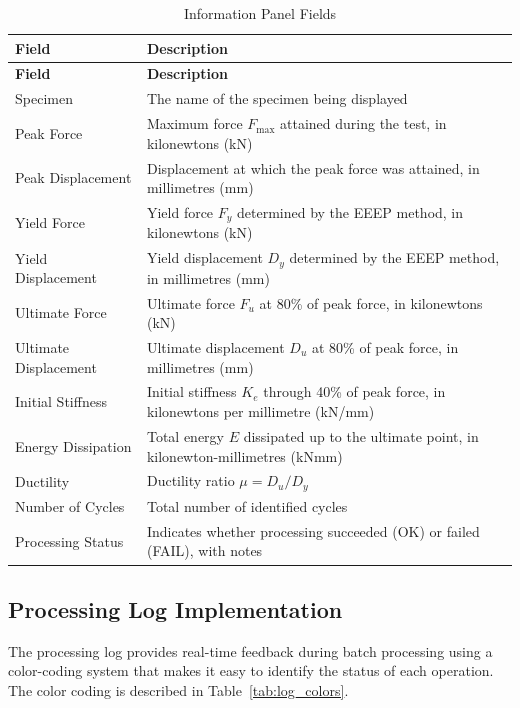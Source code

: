 \documentclass[11pt,a4paper]{article}
\begin{document}
\begin{longtable}{p{5cm}p{9cm}}
\caption{Information Panel Fields}\label{tab:info_panel}\\
\toprule
\textbf{Field} & \textbf{Description} \\
\midrule
\endfirsthead
\toprule
\textbf{Field} & \textbf{Description} \\
\midrule
\endhead
Specimen & The name of the specimen being displayed \\
Peak Force & Maximum force \(F_{\max}\) attained during the test, in kilonewtons (kN) \\
Peak Displacement & Displacement at which the peak force was attained, in millimetres (mm) \\
Yield Force & Yield force \(F_y\) determined by the EEEP method, in kilonewtons (kN) \\
Yield Displacement & Yield displacement \(D_y\) determined by the EEEP method, in millimetres (mm) \\
Ultimate Force & Ultimate force \(F_u\) at 80\% of peak force, in kilonewtons (kN) \\
Ultimate Displacement & Ultimate displacement \(D_u\) at 80\% of peak force, in millimetres (mm) \\
Initial Stiffness & Initial stiffness \(K_e\) through 40\% of peak force, in kilonewtons per millimetre (kN/mm) \\
Energy Dissipation & Total energy \(E\) dissipated up to the ultimate point, in kilonewton-millimetres (kNmm) \\
Ductility & Ductility ratio \(\mu = D_u/D_y\) \\
Number of Cycles & Total number of identified cycles \\
Processing Status & Indicates whether processing succeeded (OK) or failed (FAIL), with notes \\
\bottomrule
\end{longtable}

\subsection{Processing Log Implementation}

The processing log provides real-time feedback during batch processing using a color-coding system that makes it easy to identify the status of each operation. The color coding is described in Table~\ref{tab:log_colors}.
\end{document}
